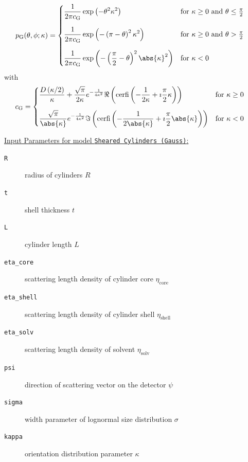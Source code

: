 \begin{align}
p_\mathrm{G}(\theta,\phi;\kappa) & =
\begin{cases}
\displaystyle
\frac{1}{2\pi c_\mathrm{G}}\exp\left(-\theta^2\kappa^2\right) & \mathrm{for~} \kappa \geq 0 \mathrm{~and~} \theta \leq \frac{\pi}{2}\\[5mm]
\displaystyle
\frac{1}{2\pi c_\mathrm{G}}\exp\left(-\left(\pi-\theta\right)^2\kappa^2\right) & \mathrm{for~} \kappa \geq 0 \mathrm{~and~} \theta > \frac{\pi}{2}\\[5mm]
\displaystyle
\frac{1}{2\pi c_\mathrm{G}}\exp\left(-\left(\frac{\pi}{2}-\theta\right)^2\abs{\kappa}^2\right) & \mathrm{for~} \kappa < 0
\end{cases}
\end{align}
with
\begin{align}
c_\mathrm{G} & =
\begin{cases}\displaystyle
\frac{D\left(\kappa/2\right)}{\kappa}
           +\frac{\sqrt{\pi}}{2\kappa} e^{-\frac{1}{4\kappa^2}} \Re\left(\mathrm{cerfi}\left(-\frac{1}{2\kappa}+\imath\frac{\pi}{2}\kappa\right) \right)& \mathrm{for~} \kappa \geq 0 \\[5mm]
\displaystyle
\frac{\sqrt{\pi}}{\abs{\kappa}} e^{-\frac{1}{4\kappa^2}} \Im\left(\mathrm{cerfi}\left(-\frac{1}{2\abs{\kappa}}+\imath\frac{\pi}{2}\abs{\kappa}\right) \right) & \mathrm{for~} \kappa < 0
\end{cases}
\end{align}

\vspace{5mm}

\uline{Input Parameters for model \texttt{Sheared Cylinders (Gauss)}:}\\
\begin{description}
\item[\texttt{R}] radius of cylinders $R$
\item[\texttt{t}] shell thickness $t$
\item[\texttt{L}] cylinder length $L$
\item[\texttt{eta\_core}] scattering length density of cylinder core $\eta_\mathrm{core}$
\item[\texttt{eta\_shell}] scattering length density of cylinder shell $\eta_\mathrm{shell}$
\item[\texttt{eta\_solv}] scattering length density of solvent $\eta_\mathrm{solv}$
\item[\texttt{psi}] direction of scattering vector on the detector $\psi$
\item[{\texttt{sigma}}] width parameter of lognormal size distribution $\sigma$
\item[{\texttt{kappa}}] orientation distribution parameter $\kappa$
\end{description}

